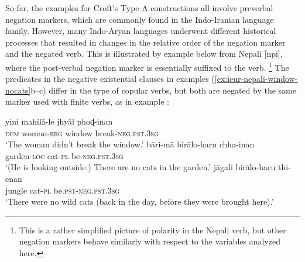 \documentclass[output=paper]{langsci/langscibook}
\begin{document}
So far, the examples for Croft's Type A constructions all involve preverbal
negation markers, which are commonly found in the Indo-Iranian language family.
However, many Indo-Aryan languages underwent different historical processes
that resulted in changes in the relative order of the negation marker and
the negated verb. This is illustrated by example  below
from Nepali [npi], where the post-verbal negation marker is essentially
suffixed to the verb.%
%
\footnote{This is a rather simplified picture of
polarity in the Nepali verb, but other negation markers behave similarly
with respect to the variables analyzed here.} 
%
The predicates in the negative existential clauses in examples
(\ref{ex:ieur-nepali-window-nocats}b--c) differ in the type of
copular verbs, but both are negated by the same marker used with finite
verbs, as in example : 
%
\begin{exe}\ex\label{ex:ieur-nepali-window-nocats}
\begin{xlist}
\ex\label{ex:ieur-nepali-window}
    \gll yini  mahilã-le jhyãl phoɖ-inan\\
  \textsc{dem} woman-\textsc{erg} window  break-\textsc{neg.pst.3sg} \\
    \glt `The woman didn't break the window.'
\ex
\gll bāri-mã       birālo-haru  chha-inan \\
garden-\textsc{loc} cat-\textsc{pl} be-\textsc{neg.pst.3sg}\\
\glt `(He is looking outside.) There are no cats in the garden.'
\ex
\gll jãgali  birālo-haru  thi-enan\\ 
jungle cat-\textsc{pl}
be.\textsc{pst}-\textsc{neg}.\textsc{pst}.\textsc{3sg}\\ 
\glt `There were no wild cats (back in the day, before they were brought
here).'
\end{xlist}\end{exe}
\end{document}
